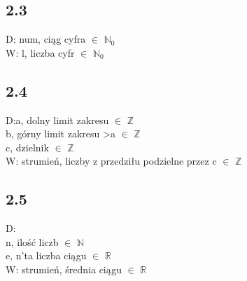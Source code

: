 \documentclass[a4paper,twoside,7pt]{book}
\begin{document}
\subsection*{2.3}
\begin{multicols}{2}
  \begin{flushleft}

    \end{flushleft}
D: num, ciąg cyfra $\in$ $\mathbb{N}_0$\\
W: l, liczba cyfr $\in$ $\mathbb{N}_0$
    \begin{flushright}
    
    \end{flushright}    
\end{multicols}
\subsection*{2.4}
\begin{multicols}{2}
  \begin{flushleft}

    \end{flushleft}
D:a, dolny limit zakresu $\in$ $\mathbb{Z}$\\
b, górny limit zakresu >a $\in$ $\mathbb{Z}$\\
c, dzielnik $\in$ $\mathbb{Z}$\\
W: strumień, liczby z przedziłu podzielne przez c $\in$ $\mathbb{Z}$
    \begin{flushright}
    
    \end{flushright}    
\end{multicols}

\subsection*{2.5}
\begin{multicols}{2}
  \begin{flushleft}

    \end{flushleft}
D: \\
n, ilość liczb $\in$ $\mathbb{N}$\\
e, n'ta liczba ciągu $\in$ $\mathbb{R}$\\
W: strumień, średnia ciągu $\in$ $\mathbb{R}$
    \begin{flushright}
    
    \end{flushright}    
\end{multicols}
\end{document}
